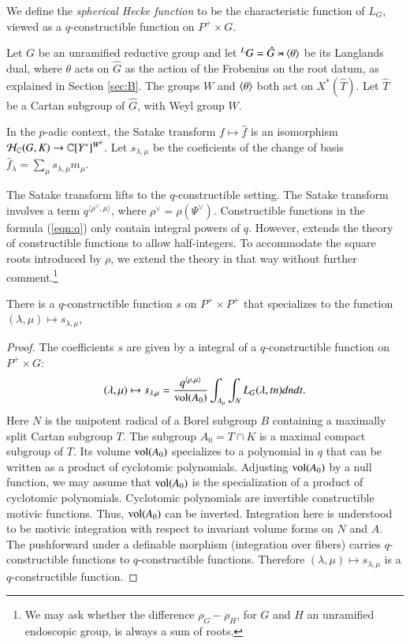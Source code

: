 We define the {\it spherical Hecke function} to be the characteristic
function of $L_G$, viewed as a $q$-constructible function on
$P^+\times G$.

Let $G$ be an unramified reductive group and let ${}^LG = \hat
G\rtimes \langle{\theta}\rangle$ be its Langlands dual, where $\theta$ acts on
$\hat G$ as the action of the Frobenius on the root datum, as
explained in Section \ref{sec:B}.  The groups $W$ and $\langle{\theta}\rangle$
both act on $X^*(\hat T)$.  Let $\hat T$ be a Cartan subgroup of $\hat
G$, with Weyl group $W$.

In the $p$-adic context, the Satake transform $f\mapsto \hat f$ is an
isomorphism $\mathcal H_{\mathbb{C}}(G,K)\to\mathbb{C}[Y^*]^{W^\theta}$.  Let
$s_{\lambda,\mu}$ be the coeficients of the change of basis $\hat
f_\lambda = \sum_\mu s_{\lambda,\mu} m_\mu$.

The Satake transform lifts to the $q$-constructible setting.  The
Satake transform involves a term $q^{\langle\rho^\vee,\mu\rangle}$,
where $\rho^\vee = \rho(\Psi^\vee)$.  Constructible functions in the
formula (\ref{eqn:q}) only contain integral powers of $q$.  However,
\cite[\S B.3.1]{cluckers2011local} extends the theory of constructible
functions to allow half-integers.  To accommodate the square roots
introduced by $\rho$, we extend the theory in that way without further
comment.\footnote{We may ask whether the difference $\rho_G - \rho_H$,
  for $G$ and $H$ an unramified endoscopic group, is always a sum of
  roots.}

\begin{lemma}\label{lemma:satake} 
  There is a $q$-constructible function $s$ on $P^+\times P^+$ that
  specializes to the function $(\lambda,\mu)\mapsto s_{\lambda,\mu}$,
\end{lemma}

\begin{proof} 
  The coefficients $s$ are given by a integral of a $q$-constructible
  function on $P^+\times G$:
\begin{equation}\label{eqn:s}
(\lambda,\mu)\mapsto s_{\lambda,\mu}
=\frac{q^{\langle\rho,\mu\rangle}}{{\operatorname{vol}}(A_0)} 
\int_{A_\mu} \int_N L_G(\lambda,t n) dn dt.
\end{equation}
Here $N$ is the unipotent radical of a Borel subgroup $B$ containing a
maximally split Cartan subgroup $T$.  The subgroup $A_0 = T\cap K$ is
a maximal compact subgroup of $T$.  Its volume ${\operatorname{vol}}(A_0)$
specializes to a polynomial in $q$ that can be written as a product of
cyclotomic polynomials.  Adjusting ${\operatorname{vol}}(A_0)$ by a null function,
we may assume that ${\operatorname{vol}}(A_0)$ is the specialization of a product
of cyclotomic polynomials.  Cyclotomic polynomials are invertible
constructible motivic functions.  Thus, ${\operatorname{vol}}(A_0)$ can be
inverted.  Integration here is understood to be motivic integration
with respect to invariant volume forms on $N$ and $A$.  The
pushforward under a definable morphism (integration over fibers)
carries $q$-constructible functions to $q$-constructible functions.
Therefore $(\lambda,\mu)\mapsto s_{\lambda,\mu}$ is a
$q$-constructible function.
\end{proof}

